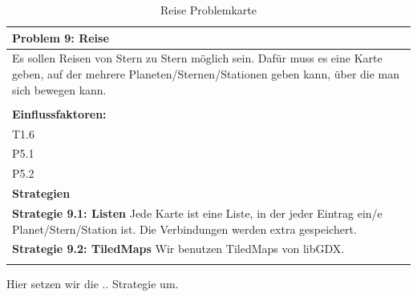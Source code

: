 \documentclass[fontsize=12pt,paper=a4,twoside]{scrartcl}
\begin{document}
\begin{table}[H]
    \centering
    \begin{tabular}{|p{15cm}|}
    \hline
          \textbf{Problem 9: Reise}  \\ \hline
	Es sollen Reisen von Stern zu Stern möglich sein. Dafür muss es eine Karte geben, auf der mehrere Planeten/Sternen/Stationen geben kann, über die man sich bewegen kann. \\
         \\ \hline
          \textbf{Einflussfaktoren: } \\
	T1.6 \\
	P5.1 \\
	P5.2 \\
          \hline
          \textbf{Strategien} \\ \hline
            {}          
           \label{strategie:9.1}     
          \textbf{Strategie 9.1: Listen} Jede Karte ist eine Liste, in der jeder Eintrag ein/e Planet/Stern/Station ist. Die Verbindungen werden extra gespeichert.  \\        
  {}          
           \label{strategie:9.2}              
          \textbf{Strategie 9.2: TiledMaps} Wir benutzen TiledMaps von libGDX.  \\
	 \\ \hline
    \end{tabular}

    \caption{Reise Problemkarte}
    \label{tab:ProblemKarte9}
\end{table}
Hier setzen wir die .. Strategie um. \\
\end{document}
